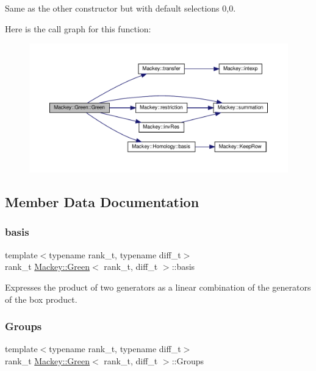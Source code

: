 Same as the other constructor but with default selections 0,0. 

Here is the call graph for this function\+:\nopagebreak
\begin{figure}[H]
\begin{center}
\leavevmode
\includegraphics[width=350pt]{classMackey_1_1Green_a5e51ae3cad1570c7a9bf2b395852982a_cgraph}
\end{center}
\end{figure}


\subsection{Member Data Documentation}
\mbox{\label{classMackey_1_1Green_a248298bf608a1f0e7e5c448a6a38ae80}} 
\subsubsection{\texorpdfstring{basis}{basis}}
{\footnotesize\ttfamily template$<$typename rank\+\_\+t, typename diff\+\_\+t$>$ \\
rank\+\_\+t \hyperlink{classMackey_1_1Green}{Mackey\+::\+Green}$<$ rank\+\_\+t, diff\+\_\+t $>$\+::basis}



Expresses the product of two generators as a linear combination of the generators of the box product. 

\mbox{\label{classMackey_1_1Green_acfa5ea708949024bd24f1c1e21399cbc}} 
\subsubsection{\texorpdfstring{Groups}{Groups}}
{\footnotesize\ttfamily template$<$typename rank\+\_\+t, typename diff\+\_\+t$>$ \\
rank\+\_\+t \hyperlink{classMackey_1_1Green}{Mackey\+::\+Green}$<$ rank\+\_\+t, diff\+\_\+t $>$\+::Groups}



